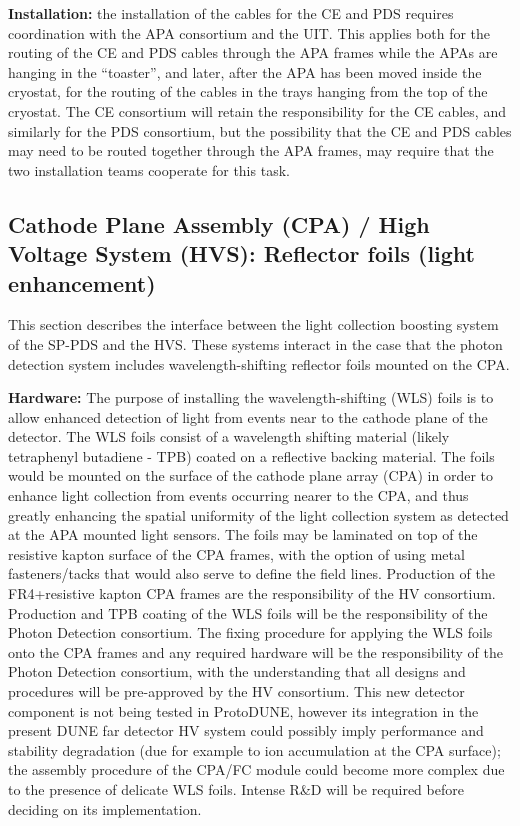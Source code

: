 \textbf{Installation:} the installation of the cables for the CE and PDS requires coordination with the APA consortium and the UIT. This applies both for the routing of the CE and PDS cables through the APA frames while the APAs are hanging in the “toaster”, and later, after the APA has been moved inside the cryostat, for the routing of the cables in the trays hanging from the top of the cryostat. The CE consortium will retain the responsibility for the CE cables, and similarly for the PDS consortium, but the possibility that the CE and PDS cables may need to be routed together through the APA frames, may require that the two installation teams cooperate for this task.

\subsection{Cathode Plane Assembly (CPA) / High Voltage System (HVS): Reflector foils (light enhancement)}
\label{sec:fdsp-pd-intfc-le}

This section describes the interface between the light collection boosting system of the SP-PDS  and the HVS. These systems interact in the case that the photon detection system includes wavelength-shifting reflector foils mounted on the CPA.

\textbf{Hardware: }The purpose of installing the wavelength-shifting (WLS) foils is to allow enhanced detection of light from events near to the cathode plane of the detector. The WLS foils consist of a wavelength shifting material (likely tetraphenyl butadiene - TPB) coated on a reflective backing material. The foils would be mounted on the surface of the cathode plane array (CPA) in order to enhance light collection from events occurring nearer to the CPA, and thus greatly enhancing the spatial uniformity of the light collection system as detected at the APA mounted light sensors. The foils may be laminated on top of the resistive kapton surface of the CPA frames, with the option of using metal fasteners/tacks that would also serve to define the field lines. Production of the FR4+resistive kapton CPA frames are the responsibility of the HV consortium. Production and TPB coating of the WLS foils will be the responsibility of the Photon Detection consortium. The fixing procedure for applying the WLS foils onto the CPA frames and any required hardware will be the responsibility of the Photon Detection consortium, with the understanding that all designs and procedures will be pre-approved by the HV consortium. This new detector component is not being tested in ProtoDUNE, however its integration in the present DUNE far detector HV system could possibly imply performance and stability degradation (due for example to ion accumulation at the CPA surface); the assembly procedure of the CPA/FC module could become more complex due to the presence of delicate WLS foils. Intense R\&D will be required before deciding on its implementation.

